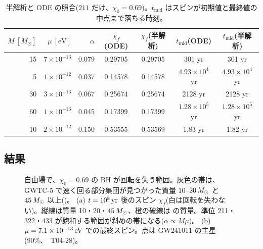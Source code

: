 \begin{table}[H]
\centering\small
\caption{半解析と ODE の照合($211$ だけ、$\chi_0=0.69$)。$t_\mathrm{mid}$ はスピンが初期値と最終値の中点まで落ちる時刻。}
\label{tab:e02_check}
\begin{tabular}{@{}rrrcccc@{}}
\toprule
$M\ [M_\odot]$ & $\mu\ [\mathrm{eV}]$ & $\alpha$ & $\chi_f$(ODE) & $\chi_f$(半解析) & $t_\mathrm{mid}$(ODE) & $t_\mathrm{mid}$(半解析) \\
\midrule
15 & $7\times10^{-13}$ & 0.079 & 0.29705 & 0.29705 & 301 yr & 301 yr \\
5 & $1\times10^{-12}$ & 0.037 & 0.14578 & 0.14578 & $4.93\times10^4$ yr & $4.93\times10^4$ yr \\
30 & $3\times10^{-13}$ & 0.067 & 0.25674 & 0.25674 & 2128 yr & 2128 yr \\
60 & $1\times10^{-13}$ & 0.045 & 0.17399 & 0.17399 & $1.28\times10^5$ yr & $1.28\times10^5$ yr \\
10 & $2\times10^{-12}$ & 0.150 & 0.53555 & 0.53569 & 1.83 yr & 1.82 yr \\
\bottomrule
\end{tabular}
\end{table}

\subsection{結果}

\begin{figure}[H]
\centering

\caption{自由場で、$\chi_0=0.69$ の BH が回転を失う範囲。灰色の帯は、GWTC-5 で速く回る部分集団が見つかった質量 $10$--$20\,M_\odot$ と $45\,M_\odot$ 以上()。
(a) $t=10^8\,\mathrm{yr}$ 後のスピン $\chi_f$(白は回転を失わない)。縦線は質量 10・20・$45\,M_\odot$、橙の破線は  の質量。準位 211・322・433 が飽和する範囲が斜めの帯になる($\alpha\propto M\mu$)。
(b) $\mu=7.1\times10^{-13}\,\mathrm{eV}$ での最終スピン。点は GW241011 の主星(90\%、\review\ T04-28)。}
\label{fig:e02}
\end{figure}

